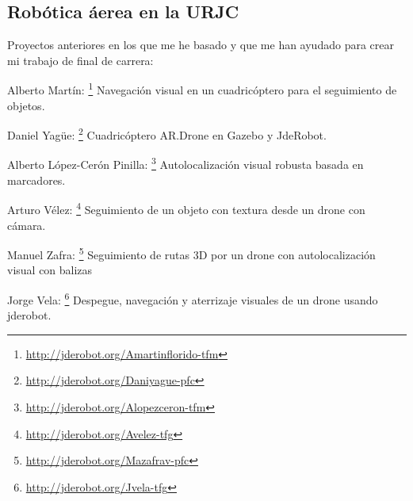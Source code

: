 \subsection{Robótica áerea en la URJC}
\hspace{1cm} Proyectos anteriores en los que me he basado y que me han ayudado para crear mi trabajo de final de carrera:

\hspace{1cm} Alberto Martín: \footnote{\url{http://jderobot.org/Amartinflorido-tfm}} Navegación visual en un cuadricóptero para el seguimiento de objetos.

\hspace{1cm} Daniel Yagüe:  \footnote{\url{http://jderobot.org/Daniyague-pfc}} Cuadricóptero AR.Drone en Gazebo y JdeRobot.

\hspace{1cm} Alberto López-Cerón Pinilla: \footnote{\url{http://jderobot.org/Alopezceron-tfm}} Autolocalización visual robusta basada en marcadores.

\hspace{1cm} Arturo Vélez:  \footnote{\url{http://jderobot.org/Avelez-tfg}} Seguimiento de un objeto con textura desde un drone con
cámara.

\hspace{1cm} Manuel Zafra: \footnote{\url{http://jderobot.org/Mazafrav-pfc}} Seguimiento de rutas 3D por un drone con autolocalización
visual con balizas

\hspace{1cm} Jorge Vela: \footnote{\url{http://jderobot.org/Jvela-tfg}} Despegue, navegación y aterrizaje visuales de un drone usando jderobot. 

